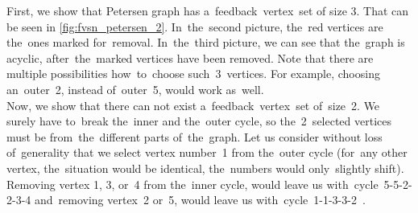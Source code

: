 First, we show that Petersen graph has a~feedback~vertex~set of size 3. That can be seen in \autoref{fig:fvsn_petersen_2}. In~the~second picture, the~red vertices are the~ones marked for~removal. In~the~third picture, we can see that the~graph is acyclic, after~the~marked vertices have been removed. Note that there are multiple possibilities how~to~choose such~3~vertices. For example, choosing an~outer~2, instead of~outer~5, would work as~well. \\
Now, we show that there can not exist a~feedback~vertex~set of~size~2. We surely have to~break the~inner and the~outer cycle, so the~2~selected vertices must be from~the~different parts of~the~graph. Let us consider without loss of~generality that we select vertex number~1 from the~outer cycle (for~any other vertex, the~situation would be identical, the~numbers would only~slightly shift).
Removing vertex 1, 3, or~4 from the~inner cycle, would leave us with~cycle~5-5-2-2-3-4 and~removing vertex~2 or~5, would leave us with~cycle~1-1-3-3-2~\cite{Beineke}.
